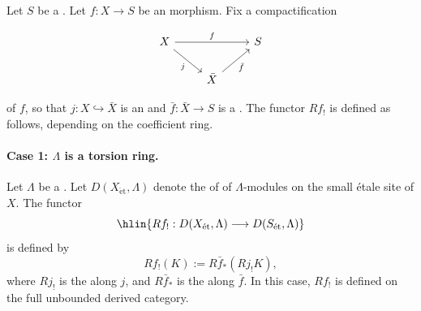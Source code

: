 \begin{definition} \label{definition:derived_direct_image_functor_with_proper_or_compact_support_for_compactifiable_morphisms_of_schemes_over_a_scheme}
Let $S$ be a . Let $f: X \to S$ be an  morphism. Fix a compactification

$$
\begin{tikzcd}
X \ar[rr, "f"] \ar[dr, "j"'] & & S \\
& \bar{X} \ar[ur, "\bar{f}"'] &
\end{tikzcd}
$$

of $f$, so that $j: X \hookrightarrow \bar{X}$ is an  and $\bar{f}: \bar{X} \to S$ is a . The functor $Rf_!$ is defined as follows, depending on the coefficient ring.

\paragraph*{Case 1: $\Lambda$ is a torsion ring.}
Let $\Lambda$ be a . Let $D(X_{\acute{\text{e}}\text{t}}, \Lambda)$ denote the  of  of $\Lambda$-modules on the small \'etale site of $X$. The functor
$$\hlin{ Rf_! : D(X_{\acute{\text{e}}\text{t}}, \Lambda) \longrightarrow D(S_{\acute{\text{e}}\text{t}}, \Lambda) }$$
is defined by
$$ Rf_!(K) := R\bar{f}_*(Rj_! K), $$
where $Rj_!$ is the  along $j$, and $R\bar{f}_*$ is the  along $\bar{f}$. In this case, $Rf_!$ is defined on the full unbounded derived category.


\end{definition}
